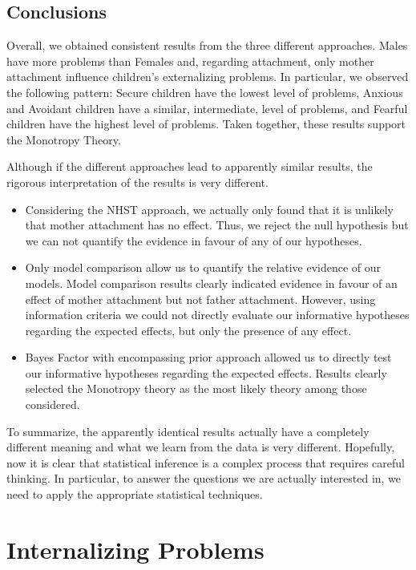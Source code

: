 \documentclass[
]{book}
\providecommand{\tightlist}{%
  \setlength{\itemsep}{0pt}\setlength{\parskip}{0pt}}
\begin{document}
\hypertarget{conclusion-ext}{%
\chapter{Conclusions}\label{conclusion-ext}}

Overall, we obtained consistent results from the three different approaches. Males have more problems than Females and, regarding attachment, only mother attachment influence children's externalizing problems. In particular, we observed the following pattern: Secure children have the lowest level of problems, Anxious and Avoidant children have a similar, intermediate, level of problems, and Fearful children have the highest level of problems. Taken together, these results support the Monotropy Theory.

Although if the different approaches lead to apparently similar results, the rigorous interpretation of the results is very different.

\begin{itemize}
\tightlist
\item
  Considering the NHST approach, we actually only found that it is unlikely that mother attachment has no effect. Thus, we reject the null hypothesis but we can not quantify the evidence in favour of any of our hypotheses.
\item
  Only model comparison allow us to quantify the relative evidence of our models. Model comparison results clearly indicated evidence in favour of an effect of mother attachment but not father attachment. However, using information criteria we could not directly evaluate our informative hypotheses regarding the expected effects, but only the presence of any effect.
\item
  Bayes Factor with encompassing prior approach allowed us to directly test our informative hypotheses regarding the expected effects. Results clearly selected the Monotropy theory as the most likely theory among those considered.
\end{itemize}

To summarize, the apparently identical results actually have a completely different meaning and what we learn from the data is very different. Hopefully, now it is clear that statistical inference is a complex process that requires careful thinking. In particular, to answer the questions we are actually interested in, we need to apply the appropriate statistical techniques.

\hypertarget{part-internalizing-problems}{%
\part*{Internalizing Problems}\label{part-internalizing-problems}}
\end{document}
